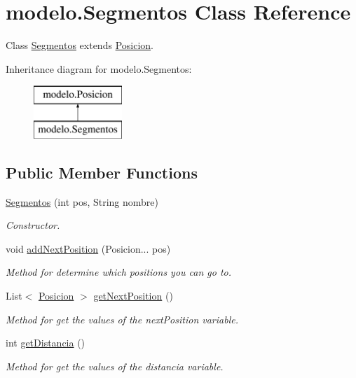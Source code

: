 \hypertarget{classmodelo_1_1_segmentos}{}\section{modelo.\+Segmentos Class Reference}
\label{classmodelo_1_1_segmentos}


Class \mbox{\hyperlink{classmodelo_1_1_segmentos}{Segmentos}} extends \mbox{\hyperlink{classmodelo_1_1_posicion}{Posicion}}.  


Inheritance diagram for modelo.\+Segmentos\+:\begin{figure}[H]
\begin{center}
\leavevmode
\includegraphics[height=2.000000cm]{classmodelo_1_1_segmentos}
\end{center}
\end{figure}
\subsection*{Public Member Functions}
\begin{DoxyCompactItemize}
\item 
\mbox{\hyperlink{classmodelo_1_1_segmentos_a27b81fdf669238c2851d4208ffbcb43a}{Segmentos}} (int pos, String nombre)
\begin{DoxyCompactList}\small\item\em Constructor. \end{DoxyCompactList}\item 
void \mbox{\hyperlink{classmodelo_1_1_segmentos_a287213096bb01f3a0f7b2944be99242c}{add\+Next\+Position}} (Posicion... pos)
\begin{DoxyCompactList}\small\item\em Method for determine which positions you can go to. \end{DoxyCompactList}\item 
List$<$ \mbox{\hyperlink{classmodelo_1_1_posicion}{Posicion}} $>$ \mbox{\hyperlink{classmodelo_1_1_segmentos_a33a1303cc99da1643d3bd7a897eca0cc}{get\+Next\+Position}} ()
\begin{DoxyCompactList}\small\item\em Method for get the values of the next\+Position variable. \end{DoxyCompactList}\item 
int \mbox{\hyperlink{classmodelo_1_1_segmentos_a3a0325af8cd98cdfe28294ed36012780}{get\+Distancia}} ()
\begin{DoxyCompactList}\small\item\em Method for get the values of the distancia variable. \end{DoxyCompactList}\end{DoxyCompactItemize}


